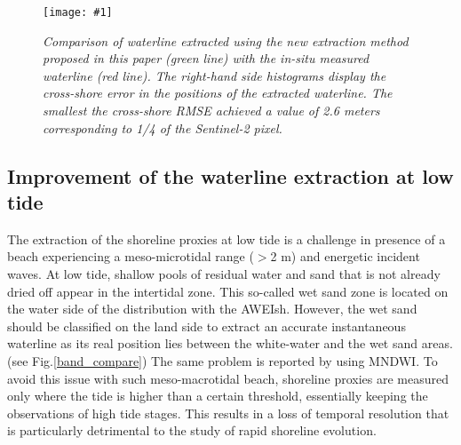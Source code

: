 \documentclass[remotesensing,article,submit,pdftex,moreauthors]{Definitions/mdpi}
\newcommand{\myfigure}[4]{
    \begin{figure*}[h!]
        \centering
        \texttt{[image: \#1]}	 
        \caption{\itshape#2}
        \label{#3}
    \end{figure*} 
}
\begin{document}
\myfigure{img/Results.png}{Comparison of waterline extracted using the new extraction method proposed in this paper (green line) with the in-situ measured waterline (red line). The right-hand side histograms display the cross-shore error in the positions of the extracted waterline. The smallest the cross-shore RMSE achieved a value of 2.6 meters corresponding to 1/4 of the Sentinel-2 pixel.}{validation}{1}

\subsection{Improvement of the waterline extraction at low tide}
The extraction of the shoreline proxies at low tide is a challenge in presence of a beach experiencing a meso-microtidal range ($>$2 m) and energetic incident waves. \citep{ALMAR2012, CASTELLE2021107707}
At low tide, shallow pools of residual water and sand that is not already dried off appear in the intertidal zone.
This so-called wet sand zone is located on the water side of the distribution with the AWEIsh.
However, the wet sand should be classified on the land side to extract an accurate instantaneous waterline as its real position lies between the white-water and the wet sand areas. (see Fig.\ref{band_compare})
The same problem is reported by \citep{VOS2019_sub} using MNDWI.
To avoid this issue with such meso-macrotidal beach, shoreline proxies are measured only where the tide is higher than a certain threshold, essentially keeping the observations of high tide stages.
This results in a loss of temporal resolution that is particularly detrimental to the study of rapid shoreline evolution.
\end{document}
